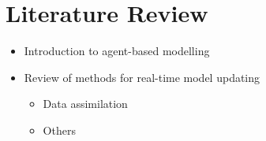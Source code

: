 \section{Literature Review}\label{sec:lit_rev}

\begin{itemize}
    \item Introduction to agent-based modelling
    \item Review of methods for real-time model updating
    \begin{itemize}
        \item Data assimilation
        \item Others
    \end{itemize}
\end{itemize}
